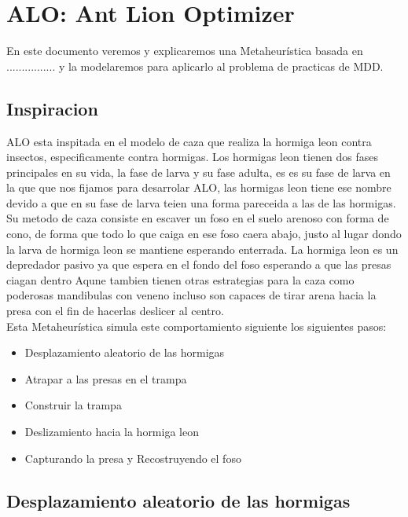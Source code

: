 \section{ALO: Ant Lion Optimizer}
En este documento veremos y explicaremos una Metaheurística basada en ................ y la modelaremos
para aplicarlo al problema de practicas de MDD.



\subsection{Inspiracion}
  ALO esta inspitada en el modelo de caza que realiza la hormiga leon contra insectos, especificamente contra hormigas.
  Los hormigas leon tienen dos fases principales en su vida, la fase de larva y su fase adulta, es es su fase de larva en la que
  que nos fijamos para desarrolar ALO, las hormigas leon tiene ese nombre devido a que en su fase de larva teien una forma 
  pareceida a las de las hormigas.\\
  Su metodo de caza consiste en escaver un foso en el suelo arenoso con forma de cono, de forma que todo lo que caiga en 
  ese foso caera abajo, justo al lugar dondo la larva de hormiga leon se mantiene esperando enterrada.
  La hormiga leon es un depredador pasivo ya que espera en el fondo del foso esperando a que las presas ciagan dentro
  Aqune tambien tienen otras estrategias para la caza como poderosas mandibulas con veneno incluso son capaces de tirar arena hacia 
  la presa con el fin de hacerlas deslicer al centro.\\

  Esta Metaheurística simula este comportamiento siguiente los siguientes pasos:
  \begin{itemize}
    \item Desplazamiento aleatorio de las hormigas
    \item Atrapar a las presas en el trampa
    \item Construir la trampa
    \item Deslizamiento hacia la hormiga leon
    \item Capturando la presa y Recostruyendo el foso
    
  \end{itemize}


  \subsection{Desplazamiento aleatorio de las hormigas}

